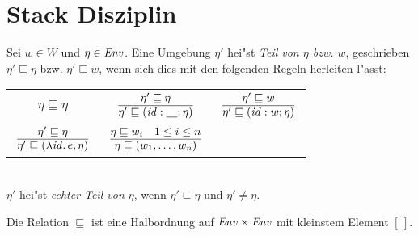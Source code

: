 \documentclass[12pt,fleqn,a4paper]{article}
\begin{document}


\section{Stack Disziplin}

\begin{definition}
  Sei $w \in W$ und $\eta \in {\text{\it Env\/}}$. Eine Umgebung $\eta'$ hei"st \emph{Teil von $\eta$ bzw. $w$},
  geschrieben $\eta' \sqsubseteq \eta$ bzw. $\eta' \sqsubseteq w$, wenn sich dies mit den folgenden
  Regeln herleiten l"asst: \\[5mm]
  \begin{tabular}{ccc}
    $\eta \sqsubseteq \eta$
    & $\regel{\eta' \sqsubseteq \eta}{\eta' \sqsubseteq (\id:\underline{\quad};\eta)}$
    & $\regel{\eta' \sqsubseteq w}{\eta' \sqsubseteq (\id:w;\eta)}$ \\[3mm]
    $\regel{\eta' \sqsubseteq \eta}{\eta' \sqsubseteq (\abstr{\id}{e},\eta)}$
    & $\regel{\eta \sqsubseteq w_i \quad 1 \le i \le n}{\eta \sqsubseteq (w_1,\ldots,w_n)}$ \\[3mm]
  \end{tabular} \\[2mm]
  $\eta'$ hei"st \emph{echter Teil von $\eta$}, wenn $\eta' \sqsubseteq \eta$ und $\eta' \ne \eta$.
\end{definition}

\begin{lemma}
  Die Relation $\sqsubseteq$ ist eine Halbordnung auf ${\text{\it Env\/}} \times {\text{\it Env\/}}$ mit kleinstem Element $[\,]$.
\end{lemma}

\end{document}
